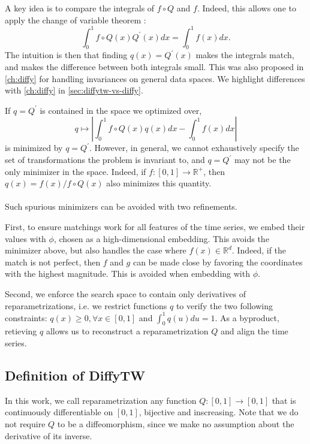 A key idea is to compare the integrals of $f\circ Q$ and $f$. Indeed, this allows one to apply the change of variable theorem \citep{change-variable-ref}:
\begin{equation}
    \int_0^1 f\circ Q(x)Q^\prime(x)dx = \int_0^1 f(x)dx.
\end{equation}
The intuition is then that finding $q(x) = Q^\prime(x)$ makes the integrals match, and makes the difference between both integrals small. This was also proposed in \cref{ch:diffy} for handling invariances on general data spaces. We highlight differences with \cref{ch:diffy} in \cref{sec:diffytw-vs-diffy}.

If $q = Q^\prime$ is contained in the space we optimized over,
\begin{equation}
    q \mapsto \left\vert\int_0^1 f\circ Q(x)q(x) dx - \int_0^1 f(x)dx\right\vert
\end{equation}
is minimized by $q=Q^\prime$. However, in general, we cannot exhaustively specify the set of transformations the problem is invariant to, and $q=Q^\prime$ may not be the only minimizer in the space. Indeed, if $f:[0,1] \to \mathbb R^+$, then $q(x) = f(x) / f\circ Q(x)$ also minimizes this quantity.

\paragraph{}
Such spurious minimizers can be avoided with two refinements.

First, to ensure matchings work for all features of the time series, we embed their values with $\phi$, chosen as a high-dimensional embedding. This avoids the minimizer above, but also handles the case where $f(x)\in\mathbb R^d$. Indeed, if the match is not perfect, then $f$ and $g$ can be made close by favoring the coordinates with the highest magnitude. This is avoided when embedding with $\phi$.

Second, we enforce the search space to contain only derivatives of reparametrizations, i.e. we restrict functions $q$ to verify the two following constraints: $q(x) \geq 0, \forall x\in[0,1]$ and $\int_0^1 q(u)du=1$. As a byproduct, retieving $q$ allows us to reconstruct a reparametrization $Q$ and align the time series.

\subsection{Definition of DiffyTW}
In this work, we call reparametrization any function $Q: [0,1] \to [0,1]$ that is continuously differentiable on $[0,1]$, bijective and inscreasing. Note that we do not require $Q$ to be a diffeomorphism, since we make no assumption about the derivative of its inverse.

